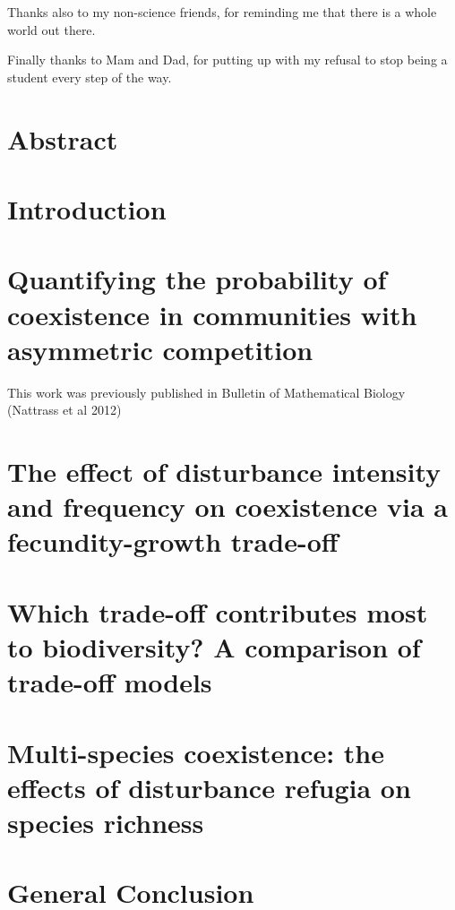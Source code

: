 \documentclass[a4paper]{report}
\begin{document}
Thanks also to my non-science friends, for reminding me that there is a whole world out there.

Finally thanks to Mam and Dad, for putting up with my refusal to stop being a student every step of the way. 

\chapter*{Abstract}


\tableofcontents
\listoffigures
\listoftables


\chapter*{Introduction}


\newpage
\chapter{Quantifying the probability of coexistence in communities with asymmetric competition}
This work was previously published in Bulletin of Mathematical Biology (Nattrass et al 2012)


\newpage
\chapter{The effect of disturbance intensity and frequency on coexistence via a fecundity-growth trade-off}


\newpage
\chapter{Which trade-off contributes most to biodiversity? A comparison of trade-off models}


\newpage
\chapter{Multi-species coexistence: the effects of disturbance refugia on species richness}



\newpage
\chapter*{General Conclusion}



\pagebreak
\end{document}
